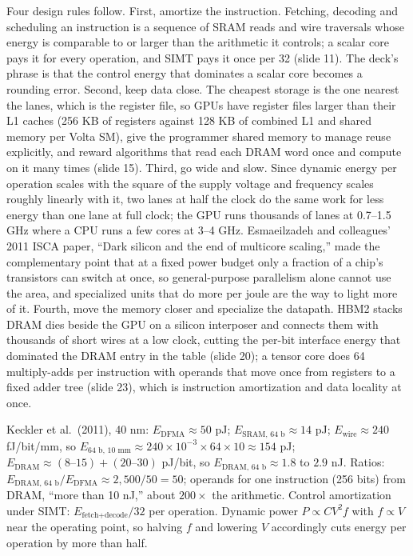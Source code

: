 \documentclass[11pt,letterpaper]{article}
\newenvironment{formulas}{\begin{tcolorbox}[formulabox]}{\end{tcolorbox}}
\begin{document}
Four design rules follow. First, amortize the instruction. Fetching, decoding and scheduling an instruction is a sequence of SRAM reads and wire traversals whose energy is comparable to or larger than the arithmetic it controls; a scalar core pays it for every operation, and SIMT pays it once per 32 (slide 11). The deck's phrase is that the control energy that dominates a scalar core becomes a rounding error. Second, keep data close. The cheapest storage is the one nearest the lanes, which is the register file, so GPUs have register files larger than their L1 caches (256 KB of registers against 128 KB of combined L1 and shared memory per Volta SM), give the programmer shared memory to manage reuse explicitly, and reward algorithms that read each DRAM word once and compute on it many times (slide 15). Third, go wide and slow. Since dynamic energy per operation scales with the square of the supply voltage and frequency scales roughly linearly with it, two lanes at half the clock do the same work for less energy than one lane at full clock; the GPU runs thousands of lanes at 0.7--1.5 GHz where a CPU runs a few cores at 3--4 GHz. Esmaeilzadeh and colleagues' 2011 ISCA paper, ``Dark silicon and the end of multicore scaling,'' made the complementary point that at a fixed power budget only a fraction of a chip's transistors can switch at once, so general-purpose parallelism alone cannot use the area, and specialized units that do more per joule are the way to light more of it. Fourth, move the memory closer and specialize the datapath. HBM2 stacks DRAM dies beside the GPU on a silicon interposer and connects them with thousands of short wires at a low clock, cutting the per-bit interface energy that dominated the DRAM entry in the table (slide 20); a tensor core does 64 multiply-adds per instruction with operands that move once from registers to a fixed adder tree (slide 23), which is instruction amortization and data locality at once.

\begin{formulas}
Keckler et al.\ (2011), 40 nm: $E_{\text{DFMA}} \approx 50$ pJ; $E_{\text{SRAM, 64 b}} \approx 14$ pJ; $E_{\text{wire}} \approx 240$ fJ/bit/mm, so $E_{\text{64 b, 10 mm}} \approx 240\times 10^{-3} \times 64 \times 10 \approx 154$ pJ; $E_{\text{DRAM}} \approx (8\text{--}15) + (20\text{--}30)$ pJ/bit, so $E_{\text{DRAM, 64 b}} \approx 1.8$ to $2.9$ nJ. Ratios: $E_{\text{DRAM, 64 b}}/E_{\text{DFMA}} \approx 2{,}500/50 = 50$; operands for one instruction (256 bits) from DRAM, ``more than 10 nJ,'' about $200\times$ the arithmetic. Control amortization under SIMT: $E_{\text{fetch+decode}}/32$ per operation. Dynamic power $P \propto C V^2 f$ with $f \propto V$ near the operating point, so halving $f$ and lowering $V$ accordingly cuts energy per operation by more than half.
\end{formulas}
\end{document}
